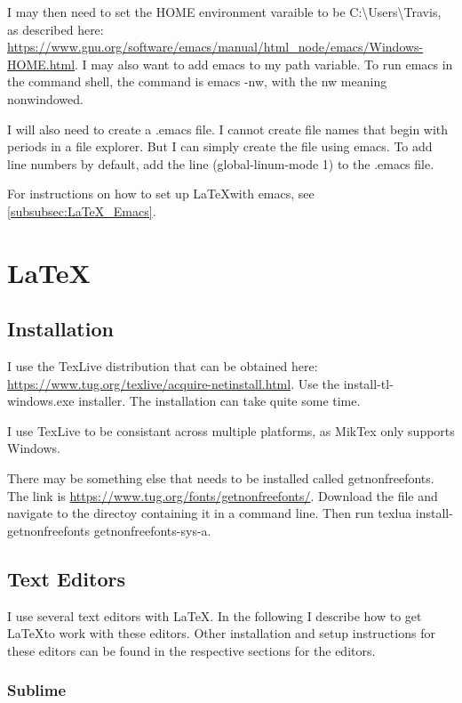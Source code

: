 \documentclass{article}
\begin{document}
I may then need to set the HOME environment varaible to be C:\textbackslash{}Users\textbackslash{}Travis,
	as described here:
	\url{https://www.gnu.org/software/emacs/manual/html_node/emacs/Windows-HOME.html}.
I may also want to add emacs to my path variable.
To run emacs in the command shell, the command is emacs -nw, with the nw meaning nonwindowed.

I will also need to create a .emacs file.
I cannot create file names that begin with periods in a file explorer.
But I can simply create the file using emacs.
To add line numbers by default, add the line (global-linum-mode 1) to the .emacs file.

For instructions on how to set up \LaTeX with emacs, see \cref{subsubsec:LaTeX_Emacs}.

\section{\LaTeX}

\subsection{Installation}

I use the TexLive distribution that can be obtained here:
	\url{https://www.tug.org/texlive/acquire-netinstall.html}.
Use the install-tl-windows.exe installer.
The installation can take quite some time.

I use TexLive to be consistant across multiple platforms, as MikTex only supports Windows.

There may be something else that needs to be installed called getnonfreefonts.
The link is \url{https://www.tug.org/fonts/getnonfreefonts/}.
Download the file and navigate to the directoy containing it in a command line.
Then run texlua install-getnonfreefonts getnonfreefonts-sys-a.

\subsection{Text Editors}

I use several text editors with \LaTeX.
In the following I describe how to get \LaTeX to work with these editors.
Other installation and setup instructions for these editors can be found in the respective sections for the editors.

\subsubsection{Sublime}
\end{document}
